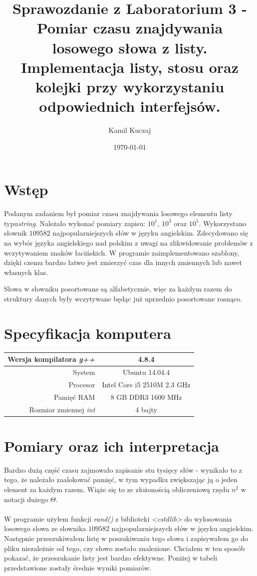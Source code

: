 \documentclass[11pt,a4paper]{article}
\author{Kamil Kuczaj}
\title{Sprawozdanie z Laboratorium 3 - Pomiar czasu znajdywania losowego słowa z listy.\\Implementacja listy, stosu oraz kolejki przy wykorzystaniu odpowiednich interfejsów.}
\date{\today}
\begin{document}
\maketitle

\section{Wstęp}
Podanym zadaniem był pomiar czasu znajdywania losowego elementu listy typu\textit{string}. Należało wykonać pomiary zapisu: $10^1$, $10^3$ oraz $10^5$. Wykorzystano słownik $109582$ najpopularniejszych słów w języku angielskim. Zdecydowano się na wybór języka angielskiego nad polskim z uwagi na zlikwidowanie problemów z wczytywaniem znaków łacińskich. W programie zaimplementowano szablony, dzięki czemu bardzo łatwo jest zmierzyć czas dla innych zmiennych lub nawet własnych klas.

Słowa w słowniku posortowane są alfabetycznie, więc za każdym razem do struktury danych były wczytywane będąc już uprzednio posortowane rosnąco.

\section{Specyfikacja komputera}

\begin{center}
	\begin{tabular}{| r | c |}
	\hline
	Wersja kompilatora \textit{g++} & 4.8.4 \\ \hline
	System & Ubuntu 14.04.4 \\ \hline
	Procesor	 & Intel Core i5 2510M 2.3 GHz \\ \hline
	Pamięć RAM & 8 GB DDR3 1600 MHz \\ \hline
	Rozmiar zmiennej \textit{int} & 4 bajty \\ \hline
	\end{tabular}
\end{center}

\section{Pomiary oraz ich interpretacja}
\bigskip

Bardzo dużą część czasu zajmowało zapisanie stu tysięcy słów - wynikało to z tego, że należało zaalokować pamięć, w tym wypadku zwiększając ją o jeden element za każdym razem. Wiąże się to ze złożonością obliczeniową rzędu $n^2$ w notacji dużego $\Theta$.\\\\
W programie użyłem funkcji \textit{rand()} z biblioteki \textit{<cstdlib>} do wylosowania losowego slowa ze slownika $109582$ najpopularniejszych słów w języku angielskim. Następnie przeszukiwałem listę w poszukiwaniu tego słowa i zapisywałem go do pliku niezależnie od tego, czy słowo zostało znalezione. Chciałem w ten sposób pokazać, że przeszukanie listy jest bardzo efektywne. Poniżej w tabeli przedstawione zostały średnie wyniki pomiarów.\\\\\\
\end{document}
